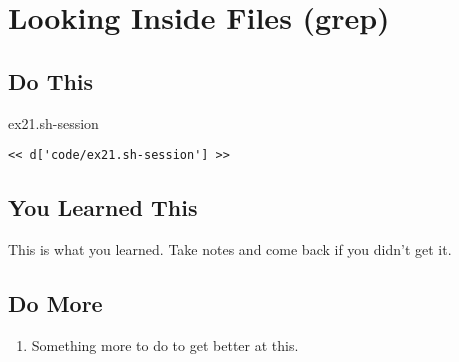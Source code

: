 \chapter{Looking Inside Files (grep)}

\section{Do This}

\begin{code}{ex21.sh-session}
\begin{Verbatim}
<< d['code/ex21.sh-session'] >>
\end{Verbatim}
\end{code}


\section{You Learned This}

This is what you learned.  Take notes and come back if you didn't get it.

\section{Do More}

\begin{enumerate}
\item Something more to do to get better at this.
\end{enumerate}

